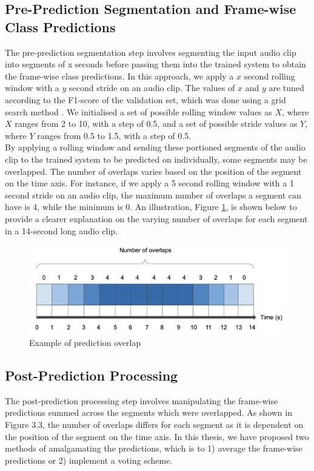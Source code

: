 \subsection{Pre-Prediction Segmentation and Frame-wise Class Predictions}
The pre-prediction segmentation step involves segmenting the input audio clip into segments of x seconds before passing them into the trained system to obtain the frame-wise class predictions. 
In this approach, we apply a \(x\) second rolling window with a \(y\) second stride on an audio clip. The values of \(x\) and \(y\) are tuned according to the F1-score of the validation set, which was done using a grid search method \cite{lavalle2004relationship}. We initialised a set of possible rolling window values as \(X\), where \(X\) ranges from 2 to 10, with a step of 0.5, and a set of possible stride values as \(Y\), where \(Y\) ranges from 0.5 to 1.5, with a step of 0.5.\\ 

By applying a rolling window and sending these portioned segments of the audio clip to the trained system to be predicted on individually, some segments may be overlapped. The number of overlaps varies based on the position of the segment on the time axis. For instance, if we apply a 5 second rolling window with a 1 second stride on an audio clip, the maximum number of overlaps a segment can have is 4, while the minimum is 0. An illustration, Figure \ref{fig:overlap}, is shown below to provide a clearer explanation on the varying number of overlaps for each segment in a 14-second long audio clip.

\begin{figure}[!htb]
    \centering
    \includegraphics[width=\textwidth]{fig/overlap.png}
    \caption{Example of prediction overlap}
    \label{fig:overlap}
\end{figure}

\subsection{Post-Prediction Processing}
The post-prediction processing step involves manipulating the frame-wise predictions summed across the segments which were overlapped. As shown in Figure 3.3, the number of overlaps differs for each segment as it is dependent on the position of the segment on the time axis. In this thesis, we have proposed two methods of amalgamating the predictions, which is to 1) average the frame-wise predictions or 2) implement a voting scheme.   


